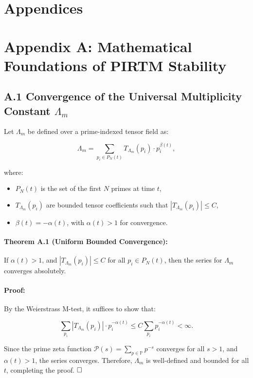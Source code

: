 \appendix

\section*{Appendices}

\section{Appendix A: Mathematical Foundations of PIRTM Stability}
\subsection{A.1 Convergence of the Universal Multiplicity Constant \(\Lambda_m\)}
Let \(\Lambda_m\) be defined over a prime-indexed tensor field as:

\[
\Lambda_m = \sum_{p_i \in P_N(t)} T_{\Lambda_m}(p_i) \cdot p_i^{\beta(t)},
\]

where:
\begin{itemize}
  \item \(P_N(t)\) is the set of the first \(N\) primes at time \(t\),
  \item \(T_{\Lambda_m}(p_i)\) are bounded tensor coefficients such that \(|T_{\Lambda_m}(p_i)| \leq C\),
  \item \(\beta(t) = -\alpha(t)\), with \(\alpha(t) > 1\) for convergence.
\end{itemize}

\paragraph{Theorem A.1 (Uniform Bounded Convergence):}
If \(\alpha(t) > 1\), and \(|T_{\Lambda_m}(p_i)| \leq C\) for all \(p_i \in P_N(t)\), then the series for \(\Lambda_m\) converges absolutely.

\paragraph{Proof:}
By the Weierstrass M-test, it suffices to show that:

\[
\sum_{p_i} |T_{\Lambda_m}(p_i)| \cdot p_i^{-\alpha(t)} \leq C \sum_{p_i} p_i^{-\alpha(t)} < \infty.
\]

Since the prime zeta function \(\mathcal{P}(s) = \sum_{p \in \mathbb{P}} p^{-s}\) converges for all \(s > 1\), and \(\alpha(t) > 1\), the series converges. Therefore, \(\Lambda_m\) is well-defined and bounded for all \(t\), completing the proof. \(\hfill \square\)


